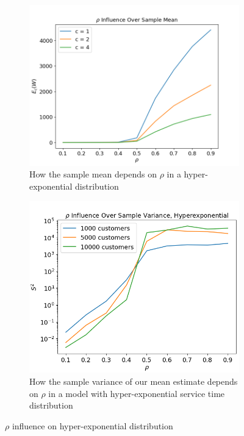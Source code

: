 \documentclass{article}
\begin{document}
    \begin{figure}[h]
        \centering
        \begin{subfigure}[b]{0.45\linewidth}
            \includegraphics[width=\textwidth]{pictures/part_4/hyp_exp_mean.png}
            \vspace*{1pt}
            \caption{How the sample mean depends on $\rho$ in a hyper-exponential distribution}
            \label{fig:samp_mean_hypexp}
        \end{subfigure}
        \begin{subfigure}[b]{0.45\linewidth}
            \includegraphics[width=.94\textwidth]{pictures/part_4/samp_var_hypexp.png}
            \caption{How the sample variance of our mean estimate depends on $\rho$ in a model with hyper-exponential service time distribution}
            \label{fig:samp_var_hypexp}
        \end{subfigure}
        \caption{$\rho$ influence on hyper-exponential distribution}
        \label{fig:hyperexp_sample_mean_var}
    \end{figure}
\end{document}
